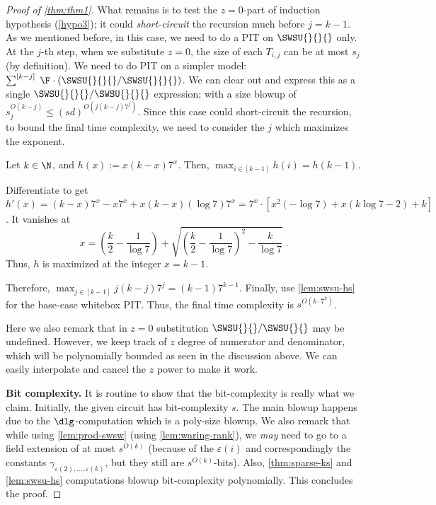 \begin{proof}[Proof of \autoref{thm:thm1}]
What remains is to test the $z=0$-part of induction hypothesis (\ref{hypo3}); it could \emph{short-circuit} the recursion much before $j=k-1$. As we mentioned before, in this case, we need to do a PIT on $\SWSU{}{}{}$ only. At the $j$-th step, when we substitute $z=0$, the size of each $T_{i,j}$ can be at most $s_j$ (by definition). We need to do PIT on a simpler model: $\sum^{[k-j]}\;\F \cdot (\SWSU{}{}{}/\SWSU{}{}{})$. We can clear out and express this as a single $\SWSU{}{}{}/\SWSU{}{}{}$ expression; with a size blowup of $s_j^{O(k-j)} \le (sd)^{O(j(k-j)7^j)}$. Since this case could short-circuit the recursion, to bound the final time complexity, we need to consider the $j$ which maximizes the exponent.

\begin{lemma}\label{max-exp-opt}
    Let $k \in \N$, and $h(x):= x (k-x)7^x$. Then, $\max_{i \in [k-1]} h(i)=h(k-1)$.
\end{lemma}
\begin{proof-sketch}
    Differentiate to get $h'(x)= (k-x)7^x - x7^x +  x(k-x)(\log 7)7^x = 7^x\cdot[x^2(-\log7) + x(k\log7-2) + k ]$. It vanishes at \[x = \left(\frac{k}{2} - \frac{1}{\log 7}\right) + \sqrt{\left(\frac{k}{2} - \frac{1}{\log 7}\right)^2 - \frac{k}{\log 7}}\;.\]Thus, $h$ is maximized at the integer $x=k-1$.
\end{proof-sketch}


Therefore, $\max_{j \in [k-1]} j(k-j)7^j = (k-1)7^{k-1}$. 
%
Finally, use \autoref{lem:swsu-hs} for the base-case whitebox PIT. Thus, the final time complexity is $s^{O(k \cdot 7^k)}$. 

Here we also remark that in $z =0$ substitution $\SWSU{}{}/\SWSU{}{}$ may be undefined. However, we keep track of $z$ degree of numerator and denominator, which will be polynomially bounded as seen in the discussion above. We can easily interpolate and cancel the $z$ power to make it work. 

\smallskip
{\bf \noindent Bit complexity.} It is routine to show that the  bit-complexity is really what we claim. Initially, the given circuit has bit-complexity $s$. The main blowup happens due to the $\dlg$-computation which is a poly-size blowup. We also remark that while using \autoref{lem:prod-swsw} (using \autoref{lem:waring-rank}), we \emph{may} need to go to a field extension of at most $s^{O(k)}$ (because of the $\varepsilon(i)$ and correspondingly the constants $\gamma_{\varepsilon(2),\hdots,\varepsilon(k)}$, but they still are $s^{O(k)}$-bits). Also, \autoref{thm:sparse-ks} and \autoref{lem:swsu-hs} computations blowup bit-complexity polynomially. This concludes the proof.
\end{proof}

